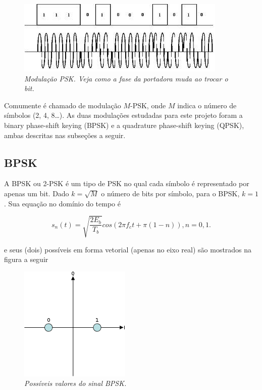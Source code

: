\documentclass[a4paper,twocolumn]{article}
\begin{document}
\begin{figure}[h]
    \label{fig:psk_mod}
    \centering
    \includegraphics[scale=0.55]{psk-mod}
    \caption{\textit{Modulação PSK. Veja como a fase da portadora muda ao trocar o bit.}}
\end{figure}

Comumente é chamado de modulação $M$-PSK, onde $M$ indica o número de símbolos (2, 4, 8\dots). As duas modulações estudadas para este projeto foram a binary phase-shift keying (BPSK) e a quadrature phase-shift keying (QPSK), ambas descritas nas subseções a seguir.

\subsection{BPSK}

A BPSK ou 2-PSK é um tipo de PSK no qual cada símbolo é representado por apenas um bit. Dado $k = \sqrt{M}$ o número de bits por símbolo, para o BPSK, $k = 1$. Sua equação no domínio do tempo é

\begin{equation}
    \label{eq:bpsk_time}
    s_n(t) = \sqrt{\frac{2E_b}{T_b}}cos(2\pi f_c t + \pi(1 - n)), n = 0, 1.
\end{equation}

\noindent e seus (dois) possíveis em forma vetorial (apenas no eixo real) são mostrados na figura a seguir

\begin{figure}[h]
    \label{fig:bpsk_vector}
    \centering
    \includegraphics[scale=0.55]{bpsk-vector}
    \caption{\textit{Possíveis valores do sinal BPSK.}}
\end{figure}
\end{document}
